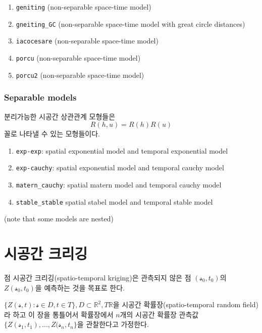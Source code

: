 \documentclass[b5paper,]{book}
\theoremstyle{definition}
\theoremstyle{definition}
\theoremstyle{definition}
\theoremstyle{remark}
\begin{document}
\begin{enumerate}
\def\labelenumi{\arabic{enumi}.}
\item
  \texttt{geniting} (non-separable space-time model)
\item
  \texttt{gneiting\_GC} (non-separable space-time model with great
  circle distances)
\item
  \texttt{iacocesare} (non-separable space-time model)
\item
  \texttt{porcu} (non-separable space-time model)
\item
  \texttt{porcu2} (non-separable space-time model)
\end{enumerate}

\subsection{Separable models}\label{separable-models}

분리가능한 시공간 상관관계 모형들은 \[R(h,u)=R(h)R(u)\] 꼴로 나타낼 수
있는 모형들이다.

\begin{enumerate}
\def\labelenumi{\arabic{enumi}.}
\item
  \texttt{exp-exp}: spatial exponential model and temporal exponential
  model
\item
  \texttt{exp-cauchy}: spatial exponential model and temporal cauchy
  model
\item
  \texttt{matern\_cauchy}: spatial matern model and temporal cauchy
  model
\item
  \texttt{stable\_stable} spatial stabel model and temporal stable model
\end{enumerate}

(note that some models are nested)

\chapter{시공간 크리깅}\label{stkriging}

점 시공간 크리깅(spatio-temporal kriging)은 관측되지 않은 점
\((\mathcal{s}_{0},t_{0})\)의 \(Z(\mathcal{s}_{0},t_{0})\)을 예측하는
것을 목표로 한다.

\(\{ Z(\mathcal{s}, t): \mathcal{s}\in D, t\in T\}, D \subset \mathbb{R}^{2}, T\mathbb{R}\)을
시공간 확률장(spatio-temporal random field)라 하고 이 장을 통틀어서
확률장에서 \(n\)개의 시공간 확률장 관측값
\(\{ Z(\mathcal{s}_{1}, t_{1}), \ldots , Z(\mathcal{s}_{n}, t_{n}\}\)을
관찰한다고 가정한다.
\end{document}
